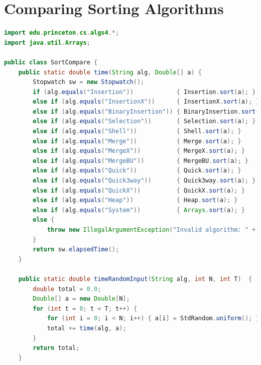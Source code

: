 \documentclass[8pt,a4paper,compress]{beamer}
\begin{document}
\section{Comparing Sorting Algorithms}
\begin{frame}[fragile]
\pause

\begin{lstlisting}[language=Java]
import edu.princeton.cs.algs4.*;
import java.util.Arrays;

public class SortCompare { 
    public static double time(String alg, Double[] a) { 
        Stopwatch sw = new Stopwatch(); 
        if (alg.equals("Insertion"))            { Insertion.sort(a); }
        else if (alg.equals("InsertionX"))      { InsertionX.sort(a); }
        else if (alg.equals("BinaryInsertion")) { BinaryInsertion.sort(a); }
        else if (alg.equals("Selection"))       { Selection.sort(a); }
        else if (alg.equals("Shell"))           { Shell.sort(a); }
        else if (alg.equals("Merge"))           { Merge.sort(a); }
        else if (alg.equals("MergeX"))          { MergeX.sort(a); }
        else if (alg.equals("MergeBU"))         { MergeBU.sort(a); } 
        else if (alg.equals("Quick"))           { Quick.sort(a); }
        else if (alg.equals("Quick3way"))       { Quick3way.sort(a); }
        else if (alg.equals("QuickX"))          { QuickX.sort(a); }
        else if (alg.equals("Heap"))            { Heap.sort(a); }
        else if (alg.equals("System"))          { Arrays.sort(a); }
        else {
            throw new IllegalArgumentException("Invalid algorithm: " + alg);
        }
        return sw.elapsedTime(); 
    } 

    public static double timeRandomInput(String alg, int N, int T)  {
        double total = 0.0; 
        Double[] a = new Double[N]; 
        for (int t = 0; t < T; t++) {
            for (int i = 0; i < N; i++) { a[i] = StdRandom.uniform(); }
            total += time(alg, a); 
        } 
        return total; 
    }
\end{lstlisting}
\end{frame}
\end{document}
